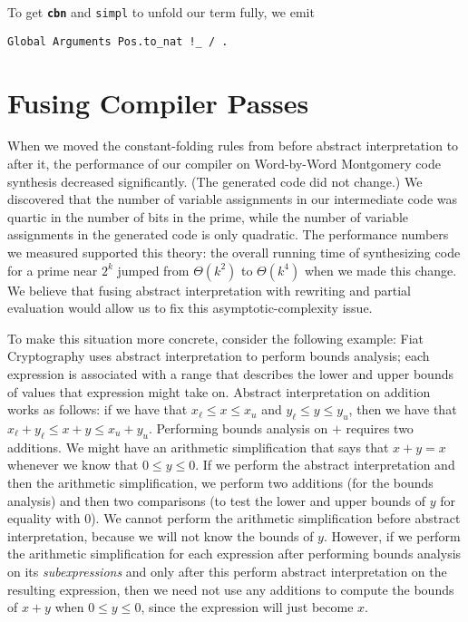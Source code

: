 \documentclass[a4paper,USenglish,cleveref,autoref,thm-restate]{lipics-v2021}
\newcommand{\tacsimpl}{\texttt{simpl}}
\newcommand{\taccbn}{\textbf{\texttt{cbn}}}
\begin{document}
\begin{minipage}[t][1cm]{\textwidth}
To get \taccbn{} and \tacsimpl{} to unfold our term fully, we emit
\begin{verbatim}
Global Arguments Pos.to_nat !_ / .
\end{verbatim}


\FloatBarrier\section{Fusing Compiler Passes}\label{sec:fusing-compiler-passes}

When we moved the
constant-folding rules
from before abstract interpretation to after it, the performance of our compiler on Word-by-Word Montgomery code synthesis decreased significantly.
(The generated code did not change.)
We discovered that the number of variable assignments in our intermediate code was quartic in the number of bits in the prime, while the number of variable assignments in the generated code is only quadratic.
The performance numbers we measured supported this theory: the overall running time of synthesizing code for a prime near $2^k$ jumped from $\Theta(k^2)$ to $\Theta(k^4)$ when we made this change.
We believe that fusing abstract interpretation with rewriting and partial evaluation would allow us to fix this asymptotic-complexity issue.

To make this situation more concrete, consider the following example:
Fiat Cryptography uses abstract interpretation to perform bounds analysis; each expression is associated with a range that describes the lower and upper bounds of values that expression might take on.
Abstract interpretation on addition works as follows: if we have that $x_\ell \le x \le x_u$ and $y_\ell \le y \le y_u$, then we have that $x_\ell + y_\ell \le x + y \le x_u + y_u$.
Performing bounds analysis on $+$ requires two additions.
We might have an arithmetic simplification that says that $x + y = x$ whenever we know that $0 \le y \le 0$.
If we perform the abstract interpretation and then the arithmetic simplification, we perform two additions (for the bounds analysis) and then two comparisons (to test the lower and upper bounds of $y$ for equality with 0).
We cannot perform the arithmetic simplification before abstract interpretation, because we will not know the bounds of $y$.
However, if we perform the arithmetic simplification for each expression after performing bounds analysis on its \emph{subexpressions} and only after this perform abstract interpretation on the resulting expression, then we need not use any additions to compute the bounds of $x + y$ when $0 \le y \le 0$, since the expression will just become $x$.


\end{minipage}
\end{document}

